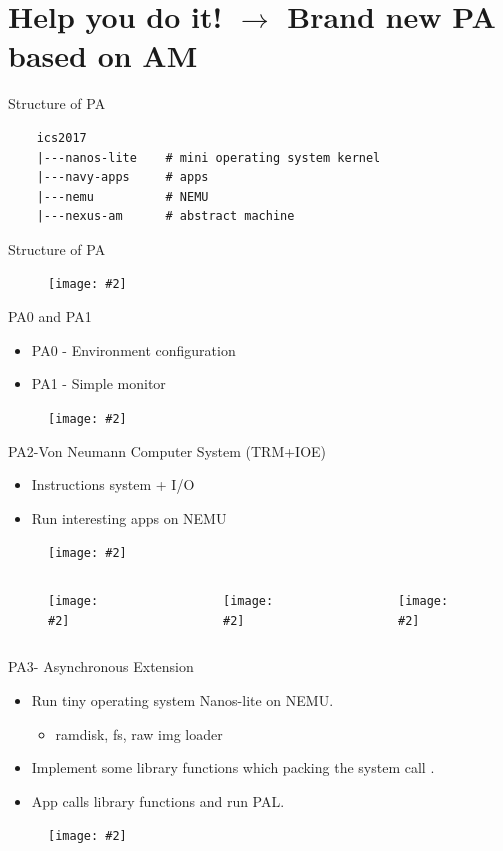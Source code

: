 \documentclass{beamer}
\newcommand{\fignocaption}[2]{
	\begin{figure}[htp]
		\centering
		\texttt{[image: \#2]}
	\end{figure}
}
\begin{document}
\section{Help you do it! $\longrightarrow$ Brand new PA based on AM}
\begin{frame}[fragile]{Structure of PA}
\begin{verbatim}
    ics2017
    |---nanos-lite    # mini operating system kernel
    |---navy-apps     # apps
    |---nemu          # NEMU
    |---nexus-am      # abstract machine
\end{verbatim}
\end{frame}

\begin{frame}{Structure of PA}
	\fignocaption{scale=0.4}{brandnewPA.png}
\end{frame}

\begin{frame}{PA0 and PA1}
	\begin{itemize}
		\item PA0 - Environment configuration
		\item PA1 - Simple monitor
	\end{itemize}
	\fignocaption{scale=0.5}{trm.png}
\end{frame}

\begin{frame}{PA2-Von Neumann Computer System (TRM+IOE)}
	\begin{itemize}
		\item Instructions system + I/O
		\item Run interesting apps on NEMU
	\end{itemize}
\fignocaption{scale=0.3}{io.png}
\begin{columns}
	\begin{column}{0.2\textwidth}
		\fignocaption{scale=0.35}{typinggame.png}
	\end{column}
\begin{column}{0.2\textwidth}
	\fignocaption{scale=0.35}{supermario.png}
\end{column}
\begin{column}{0.2\textwidth}
	\fignocaption{scale=0.35}{pal.png}
\end{column}
\end{columns}
\end{frame}


\begin{frame}{PA3- Asynchronous Extension}
	\begin{itemize}
		\item Run tiny operating system Nanos-lite on NEMU.
		\begin{itemize}
			\item ramdisk, fs, raw img loader
		\end{itemize}
		\item Implement some library functions which packing the system call .
		\item App calls library functions and run PAL.
	\end{itemize}
	\fignocaption{scale=0.4}{interrupt.png}
\end{frame}
\end{document}
